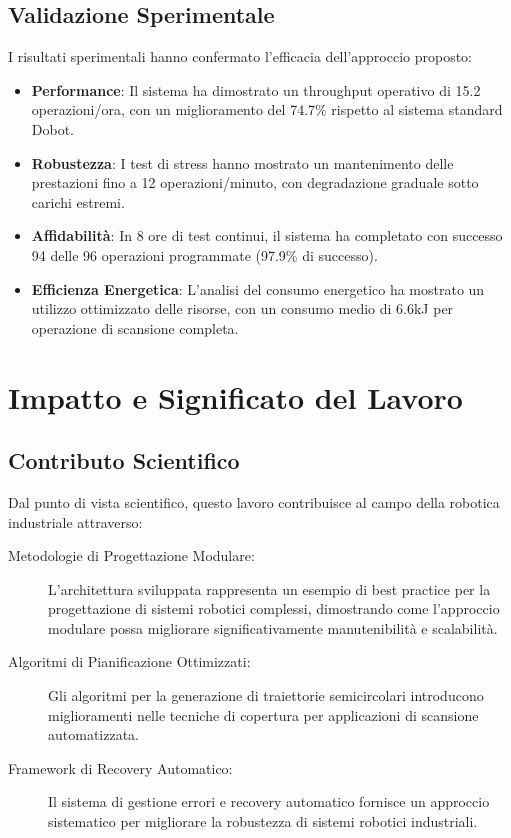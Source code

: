 \documentclass[12pt,a4paper,twoside,openright]{book}
\begin{document}
\subsection{Validazione Sperimentale}

I risultati sperimentali hanno confermato l'efficacia dell'approccio proposto:

\begin{itemize}
    \item \textbf{Performance}: Il sistema ha dimostrato un throughput operativo di 15.2 operazioni/ora, con un miglioramento del 74.7\% rispetto al sistema standard Dobot.
    
    \item \textbf{Robustezza}: I test di stress hanno mostrato un mantenimento delle prestazioni fino a 12 operazioni/minuto, con degradazione graduale sotto carichi estremi.
    
    \item \textbf{Affidabilità}: In 8 ore di test continui, il sistema ha completato con successo 94 delle 96 operazioni programmate (97.9\% di successo).
    
    \item \textbf{Efficienza Energetica}: L'analisi del consumo energetico ha mostrato un utilizzo ottimizzato delle risorse, con un consumo medio di 6.6kJ per operazione di scansione completa.
\end{itemize}

\section{Impatto e Significato del Lavoro}

\subsection{Contributo Scientifico}

Dal punto di vista scientifico, questo lavoro contribuisce al campo della robotica industriale attraverso:

\begin{description}
    \item[Metodologie di Progettazione Modulare:] L'architettura sviluppata rappresenta un esempio di best practice per la progettazione di sistemi robotici complessi, dimostrando come l'approccio modulare possa migliorare significativamente manutenibilità e scalabilità.
    
    \item[Algoritmi di Pianificazione Ottimizzati:] Gli algoritmi per la generazione di traiettorie semicircolari introducono miglioramenti nelle tecniche di copertura per applicazioni di scansione automatizzata.
    
    \item[Framework di Recovery Automatico:] Il sistema di gestione errori e recovery automatico fornisce un approccio sistematico per migliorare la robustezza di sistemi robotici industriali.
\end{description}
\end{document}
